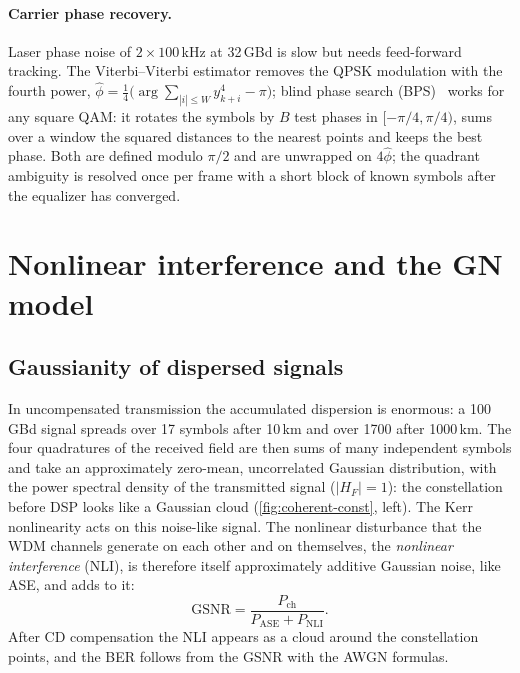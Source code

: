 \paragraph{Carrier phase recovery.} Laser phase noise of $2\times100$\,kHz at 32\,GBd is slow but needs
feed-forward tracking. The Viterbi--Viterbi estimator removes the QPSK modulation with the fourth
power, $\hat\phi=\frac14\big(\arg\sum_{|i|\le W}y_{k+i}^4-\pi\big)$; blind phase search (BPS)~\cite{pfau2009} works for any square
QAM: it rotates the symbols by $B$ test phases in $[-\pi/4,\pi/4)$, sums over a window the squared
distances to the nearest points and keeps the best phase. Both are defined modulo $\pi/2$ and are
unwrapped on $4\hat\phi$; the quadrant ambiguity is resolved once per frame with a short block of known
symbols after the equalizer has converged.

\section{Nonlinear interference and the GN model}\label{sec:gn}
\subsection{Gaussianity of dispersed signals}
In uncompensated transmission the accumulated dispersion is enormous: a 100\,GBd signal spreads over
17 symbols after 10\,km and over 1700 after 1000\,km. The four quadratures of the received field are
then sums of many independent symbols and take an approximately zero-mean, uncorrelated Gaussian
distribution, with the power spectral density of the transmitted signal ($|H_F|=1$): the constellation
before DSP looks like a Gaussian cloud (\cref{fig:coherent-const}, left). The Kerr nonlinearity acts on
this noise-like signal. The nonlinear disturbance that the WDM channels generate on each other and on
themselves, the \emph{nonlinear interference} (NLI), is therefore itself approximately additive
Gaussian noise, like ASE, and adds to it:
\begin{equation}
  \mathrm{GSNR}=\frac{P_{\mathrm{ch}}}{P_{\mathrm{ASE}}+P_{\mathrm{NLI}}} .
\end{equation}
After CD compensation the NLI appears as a cloud around the constellation points, and the BER follows
from the GSNR with the AWGN formulas.

